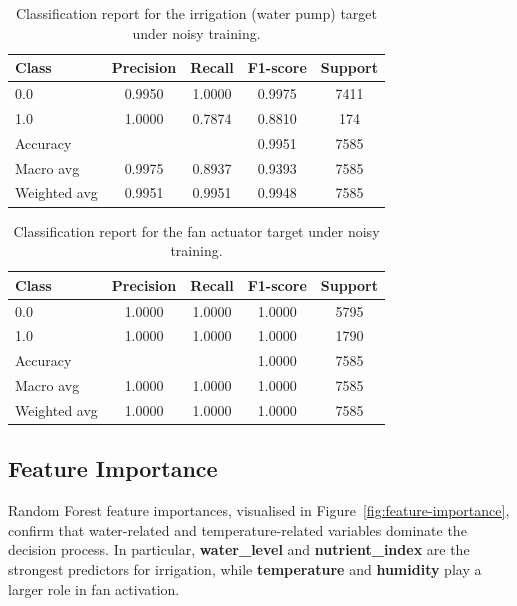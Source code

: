 \documentclass[sn-mathphys,Numbered]{sn-jnl}
\begin{document}
\begin{table}[ht]
    \centering
    \caption{Classification report for the irrigation (water pump) target under noisy training.}
    \label{tab:noise-irrigation}
    \begin{tabular}{lcccc}
        \toprule
        Class & Precision & Recall & F1-score & Support \\
        \midrule
        0.0 & 0.9950 & 1.0000 & 0.9975 & 7411 \\
        1.0 & 1.0000 & 0.7874 & 0.8810 & 174 \\
        \midrule
        Accuracy    &       &        & 0.9951 & 7585 \\
        Macro avg   & 0.9975 & 0.8937 & 0.9393 & 7585 \\
        Weighted avg& 0.9951 & 0.9951 & 0.9948 & 7585 \\
        \bottomrule
    \end{tabular}
\end{table}

\begin{table}[ht]
    \centering
    \caption{Classification report for the fan actuator target under noisy training.}
    \label{tab:noise-fan}
    \begin{tabular}{lcccc}
        \toprule
        Class & Precision & Recall & F1-score & Support \\
        \midrule
        0.0 & 1.0000 & 1.0000 & 1.0000 & 5795 \\
        1.0 & 1.0000 & 1.0000 & 1.0000 & 1790 \\
        \midrule
        Accuracy    &       &        & 1.0000 & 7585 \\
        Macro avg   & 1.0000 & 1.0000 & 1.0000 & 7585 \\
        Weighted avg& 1.0000 & 1.0000 & 1.0000 & 7585 \\
        \bottomrule
    \end{tabular}
\end{table}

\subsection{Feature Importance}

Random Forest feature importances, visualised in Figure~\ref{fig:feature-importance}, confirm that water-related and temperature-related variables dominate the decision process.  
In particular, \textbf{water\_level} and \textbf{nutrient\_index} are the strongest predictors for irrigation, while \textbf{temperature} and \textbf{humidity} play a larger role in fan activation.
\end{document}
